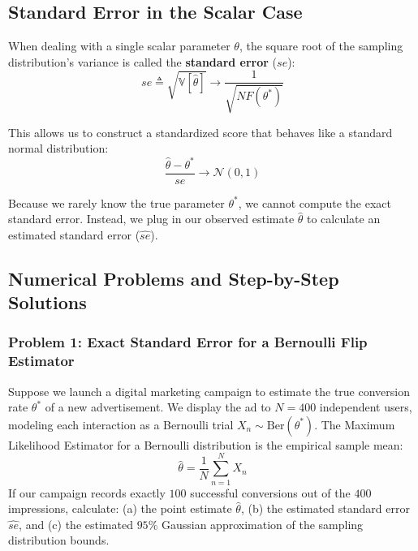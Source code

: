 \documentclass{article}
\begin{document}
\subsection{Standard Error in the Scalar Case}
When dealing with a single scalar parameter $\theta$, the square root of the sampling distribution's variance is called the \textbf{standard error} ($se$):
\begin{equation}
se \triangleq \sqrt{\mathbb{V}[\hat{\theta}]} \to \frac{1}{\sqrt{N F(\theta^*)}}
\end{equation}

This allows us to construct a standardized score that behaves like a standard normal distribution:
\begin{equation}
\frac{\hat{\theta} - \theta^*}{se} \to \mathcal{N}(0, 1)
\end{equation}

Because we rarely know the true parameter $\theta^*$, we cannot compute the exact standard error. Instead, we plug in our observed estimate $\hat{\theta}$ to calculate an estimated standard error ($\hat{se}$).

\subsection{Numerical Problems and Step-by-Step Solutions}

\subsubsection{Problem 1: Exact Standard Error for a Bernoulli Flip Estimator}
Suppose we launch a digital marketing campaign to estimate the true conversion rate $\theta^*$ of a new advertisement. We display the ad to $N = 400$ independent users, modeling each interaction as a Bernoulli trial $X_n \sim \text{Ber}(\theta^*)$. The Maximum Likelihood Estimator for a Bernoulli distribution is the empirical sample mean:
\begin{equation}
\hat{\theta} = \frac{1}{N} \sum_{n=1}^{N} X_n
\end{equation}
If our campaign records exactly $100$ successful conversions out of the $400$ impressions, calculate: (a) the point estimate $\hat{\theta}$, (b) the estimated standard error $\hat{se}$, and (c) the estimated $95\%$ Gaussian approximation of the sampling distribution bounds.
\end{document}
